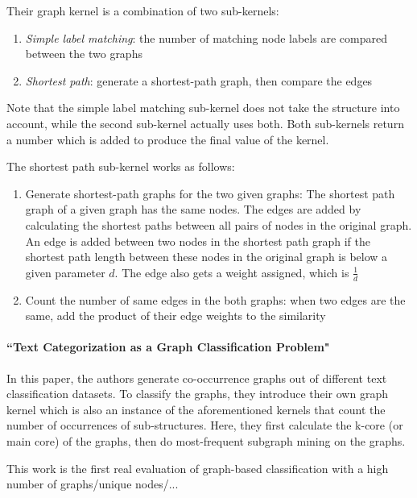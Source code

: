 Their graph kernel is a combination of two sub-kernels:
\begin{enumerate}
    \item{\textit{Simple label matching}: the number of matching node labels are compared between the two graphs}
    \item{\textit{Shortest path}: generate a shortest-path graph, then compare the edges}
\end{enumerate}
Note that the simple label matching sub-kernel does not take the structure into account, while the second sub-kernel actually uses both.
Both sub-kernels return a number which is added to produce the final value of the kernel.

The shortest path sub-kernel works as follows:
\begin{enumerate}
    \item{Generate shortest-path graphs for the two given graphs: The shortest path graph of a given graph has the same nodes.
    The edges are added by calculating the shortest paths between all pairs of nodes in the original graph. An edge is added between two nodes in the shortest path graph if the shortest path length between these nodes in the original graph is below a given parameter $d$. The edge also gets a weight assigned, which is $\frac{1}{d}$}
    \item{Count the number of same edges in the both graphs: when two edges are the same, add the product of their edge weights to the similarity}
\end{enumerate}


\paragraph{``Text Categorization as a Graph Classification Problem" \cite{Rousseau2015a}}
In this paper, the authors generate co-occurrence graphs out of different text classification datasets.
To classify the graphs, they introduce their own graph kernel which is also an instance of the aforementioned kernels that count the number of occurrences of sub-structures.
Here, they first calculate the k-core (or main core) of the graphs, then do most-frequent subgraph mining on the graphs.

This work is the first real evaluation of graph-based classification with a high number of graphs/unique nodes/...

